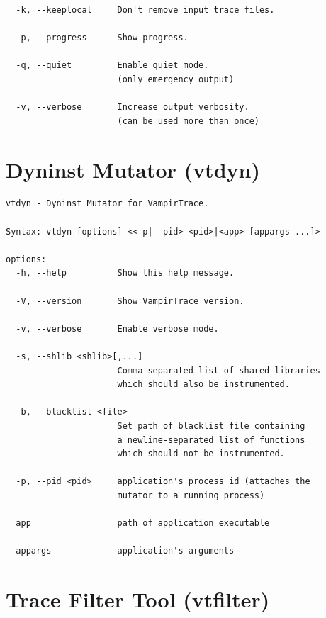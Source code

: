 \documentclass[a4paper,twoside,12pt,BCOR12mm]{scrbook}
\begin{document}
\begin{latexonly}
\begin{verbatim}
  -k, --keeplocal     Don't remove input trace files.

  -p, --progress      Show progress.

  -q, --quiet         Enable quiet mode.
                      (only emergency output)

  -v, --verbose       Increase output verbosity.
                      (can be used more than once)
\end{verbatim}
\latex{\end{small}}

\latex{\newpage}  %

\section{Dyninst Mutator (vtdyn)}
\label{sec:VTDYN}

\latex{\begin{small}}
\begin{verbatim}
vtdyn - Dyninst Mutator for VampirTrace.

Syntax: vtdyn [options] <<-p|--pid> <pid>|<app> [appargs ...]>

options:
  -h, --help          Show this help message.

  -V, --version       Show VampirTrace version.

  -v, --verbose       Enable verbose mode.

  -s, --shlib <shlib>[,...]
                      Comma-separated list of shared libraries
                      which should also be instrumented.

  -b, --blacklist <file>
                      Set path of blacklist file containing
                      a newline-separated list of functions
                      which should not be instrumented.

  -p, --pid <pid>     application's process id (attaches the 
                      mutator to a running process)

  app                 path of application executable

  appargs             application's arguments
\end{verbatim}
\latex{\end{small}}

\latex{\newpage}  %

\section{Trace Filter Tool (vtfilter)}
\label{sec:VTFILTER}


\end{latexonly}
\end{document}
